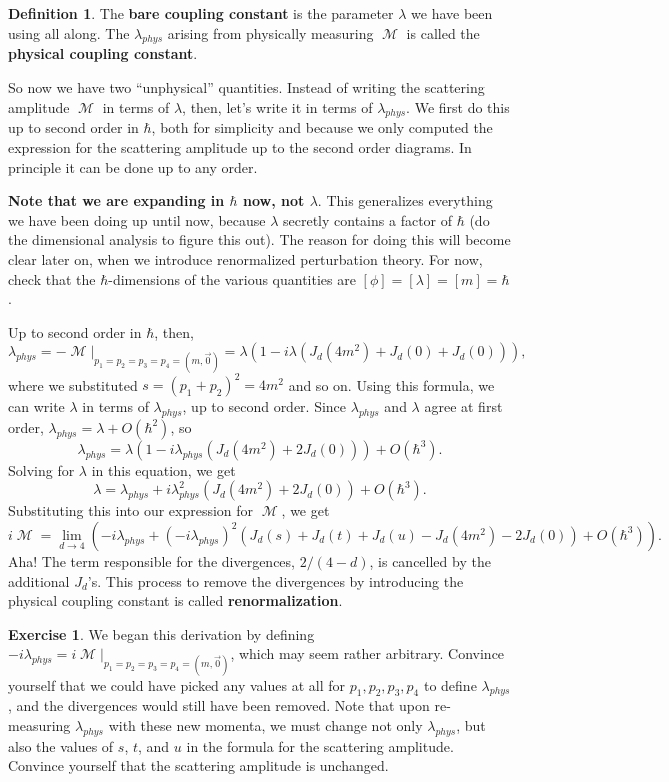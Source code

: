 \documentclass{report}
\theoremstyle{plain}
\theoremstyle{definition}
\newtheorem{definition}[theorem]{Definition}
\newtheorem{exercise}{Exercise}[section]
\theoremstyle{remark}
\DeclareMathOperator{\cM}{\mathcal{M}}
\begin{document}
\begin{definition}
  The {\bf bare coupling constant} is the parameter $\lambda$ we have
  been using all along. The $\lambda_{phys}$ arising from physically
  measuring $\cM$ is called the {\bf physical coupling constant}.
\end{definition}

So now we have two ``unphysical'' quantities. Instead of writing the
scattering amplitude $\cM$ in terms of $\lambda$, then, let's write it
in terms of $\lambda_{phys}$. We first do this up to second order in
$\hbar$, both for simplicity and because we only computed the
expression for the scattering amplitude up to the second order
diagrams. In principle it can be done up to any order.

{\bf Note that we are expanding in $\hbar$ now, not $\lambda$}. This
generalizes everything we have been doing up until now, because
$\lambda$ secretly contains a factor of $\hbar$ (do the dimensional
analysis to figure this out). The reason for doing this will become
clear later on, when we introduce renormalized perturbation theory.
For now, check that the $\hbar$-dimensions of the various quantities
are $[\phi] = [\lambda] = [m] = \hbar$.

Up to second order in $\hbar$, then,
$$ \lambda_{phys} = -\cM|_{p_1=p_2=p_3=p_4=(m,\vec{0})} = \lambda\left(1 - i\lambda(J_d(4m^2) + J_d(0) + J_d(0))\right), $$
where we substituted $s = (p_1 + p_2)^2 = 4m^2$ and so on. Using this
formula, we can write $\lambda$ in terms of $\lambda_{phys}$, up to
second order. Since $\lambda_{phys}$ and $\lambda$ agree at first
order, $\lambda_{phys} = \lambda + O(\hbar^2)$, so
$$ \lambda_{phys} = \lambda\left(1 - i\lambda_{phys}(J_d(4m^2) + 2J_d(0))\right) + O(\hbar^3). $$
Solving for $\lambda$ in this equation, we get
$$ \lambda = \lambda_{phys} + i\lambda_{phys}^2(J_d(4m^2) + 2J_d(0)) + O(\hbar^3). $$
Substituting this into our expression for $\cM$, we get
$$ i\cM = \lim_{d \to 4} \left(-i\lambda_{phys} + (-i\lambda_{phys})^2(J_d(s) + J_d(t) + J_d(u) - J_d(4m^2) - 2J_d(0)) + O(\hbar^3) \right). $$
Aha! The term responsible for the divergences, $2/(4-d)$, is cancelled
by the additional $J_d$'s. This process to remove the divergences by
introducing the physical coupling constant is called {\bf
  renormalization}.

\begin{exercise}
  We began this derivation by defining
  $-i\lambda_{phys} = i\cM|_{p_1=p_2=p_3=p_4=(m,\vec{0})}$, which may
  seem rather arbitrary. Convince yourself that we could have picked
  any values at all for $p_1, p_2, p_3, p_4$ to define
  $\lambda_{phys}$, and the divergences would still have been removed.
  Note that upon re-measuring $\lambda_{phys}$ with these new momenta,
  we must change not only $\lambda_{phys}$, but also the values of
  $s$, $t$, and $u$ in the formula for the scattering amplitude.
  Convince yourself that the scattering amplitude is unchanged.
\end{exercise}
\end{document}
